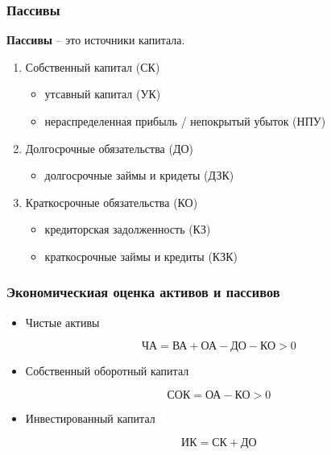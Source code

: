 \subsubsection{Пассивы}

\textbf{Пассивы} -- это источники капитала.

\begin{enumerate}
    \item Собственный капитал (СК)

        \begin{itemize}
            \item утсавный капитал (УК)
            \item нераспределенная прибыль / непокрытый убыток (НПУ)
        \end{itemize}

    \item Долгосрочные обязательства (ДО)

        \begin{itemize}
            \item долгосрочные займы и кридеты (ДЗК)
        \end{itemize}

    \item Краткосрочные обязательства (КО)

        \begin{itemize}
            \item кредиторская задолженность (КЗ)
            \item краткосрочные займы и кредиты (КЗК)
        \end{itemize}
\end{enumerate}

\subsubsection{Экономическиая оценка активов и пассивов}

\begin{itemize}
    \item Чистые активы

        \begin{equation*}
            \text{ЧА} = \text{ВА} + \text{ОА} - \text{ДО} - \text{КО} > 0
        \end{equation*}

    \item Собственный оборотный капитал

        \begin{equation*}
            \text{СОК} = \text{ОА} - \text{КО} > 0
        \end{equation*}

    \item Инвестированный капитал 

        \begin{equation*}
            \text{ИК} = С\text{К} + \text{ДО}
        \end{equation*}
\end{itemize}


